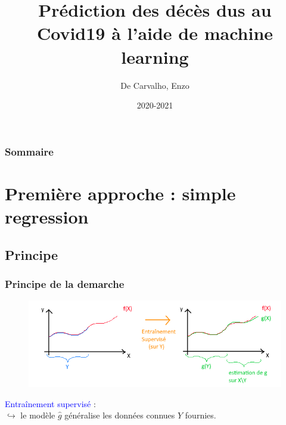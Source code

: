 \documentclass{beamer}
\title{Prédiction des décès dus au Covid19 à l'aide de machine learning}
\subtitle{}
\author{De Carvalho, Enzo}
\institute{numéro d'inscription : 29448}
\date{2020-2021}
\begin{document}
\begin{frame}
	\maketitle
\end{frame}

\begin{frame}
	\frametitle{Sommaire}
	\tableofcontents
\end{frame}

\section{Première approche : simple regression}
\subsection{Principe}
\begin{frame}
	\frametitle{Principe de la demarche}
	\begin{figure}[t]
		\centering
		\includegraphics[scale=0.65]{super_schema}
	\end{figure}
	\textcolor{blue}{Entraînement supervisé} :\\
	$\hookrightarrow$ le modèle $\hat{g}$ généralise les données connues $Y$ fournies.
\end{frame}
\end{document}
